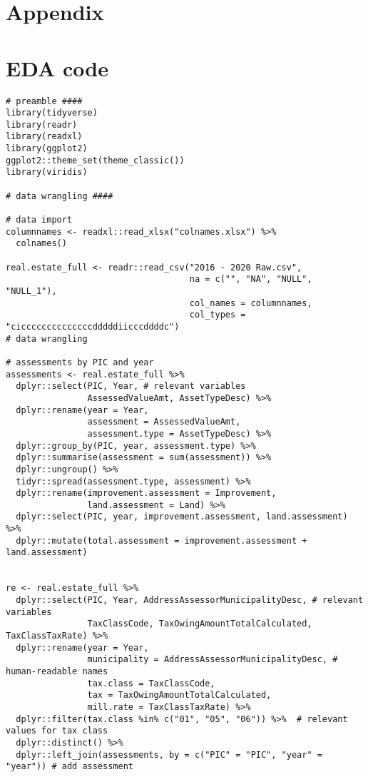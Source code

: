 \documentclass{article}
\begin{document}
\printbibliography

\clearpage
\appendix
\section*{Appendix}


\section{EDA code}


\begin{lstlisting}[style=R, caption={Code used for the exploratory data analysis.}, captionpos=b]
# preamble ####
library(tidyverse)
library(readr)
library(readxl)
library(ggplot2)
ggplot2::theme_set(theme_classic())
library(viridis)

# data wrangling ####

# data import
columnnames <- readxl::read_xlsx("colnames.xlsx") %>% 
  colnames()

real.estate_full <- readr::read_csv("2016 - 2020 Raw.csv",
                                    na = c("", "NA", "NULL", "NULL_1"),
                                    col_names = columnnames,
                                    col_types = "ciccccccccccccccdddddiicccddddc")
# data wrangling

# assessments by PIC and year
assessments <- real.estate_full %>% 
  dplyr::select(PIC, Year, # relevant variables
                AssessedValueAmt, AssetTypeDesc) %>% 
  dplyr::rename(year = Year,
                assessment = AssessedValueAmt,
                assessment.type = AssetTypeDesc) %>% 
  dplyr::group_by(PIC, year, assessment.type) %>% 
  dplyr::summarise(assessment = sum(assessment)) %>% 
  dplyr::ungroup() %>% 
  tidyr::spread(assessment.type, assessment) %>% 
  dplyr::rename(improvement.assessment = Improvement,
                land.assessment = Land) %>% 
  dplyr::select(PIC, year, improvement.assessment, land.assessment) %>% 
  dplyr::mutate(total.assessment = improvement.assessment + land.assessment)


re <- real.estate_full %>% 
  dplyr::select(PIC, Year, AddressAssessorMunicipalityDesc, # relevant variables
                TaxClassCode, TaxOwingAmountTotalCalculated, TaxClassTaxRate) %>% 
  dplyr::rename(year = Year,
                municipality = AddressAssessorMunicipalityDesc, # human-readable names
                tax.class = TaxClassCode,
                tax = TaxOwingAmountTotalCalculated,
                mill.rate = TaxClassTaxRate) %>% 
  dplyr::filter(tax.class %in% c("01", "05", "06")) %>%  # relevant values for tax class
  dplyr::distinct() %>% 
  dplyr::left_join(assessments, by = c("PIC" = "PIC", "year" = "year")) # add assessment



\end{lstlisting}
\end{document}
